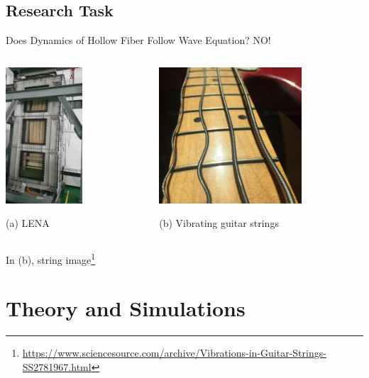 \documentclass[t,presentation]{beamer}
\begin{document}
\subsection{Research Task}
\label{sec:org9b61933}
\begin{frame}[label={sec:orgcae7768}]{Does Dynamics of Hollow Fiber Follow Wave Equation? NO!}
\vspace{0.25cm}
\begin{columns}[C]
\begin{column}{.35\textwidth}
\centering
\includegraphics[height=2in]{figures/LENA-img_2018_05_10_14_30.png}
\par (a) LENA
\end{column}
\begin{column}{.55\textwidth} %
\centering
\includegraphics[height=2in]{figures/vib-guitar-strings.jpg}
\par (b) Vibrating guitar strings
\end{column}
\end{columns}

In (b), string image\footnote{\url{https://www.sciencesource.com/archive/Vibrations-in-Guitar-Strings-SS2781967.html}}
\end{frame}

\section{Theory and Simulations}
\label{sec:orgf43736a}
\end{document}

